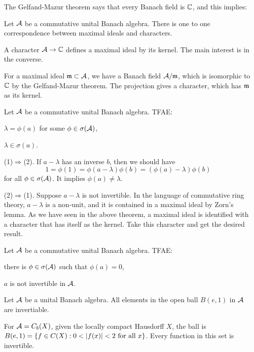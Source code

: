 \documentclass{../crs}
\begin{document}
The Gelfand-Mazur theorem says that every Banach field is $\mathbb{C}$, and this implies:
\begin{thm}
Let $\mathcal{A}$ be a commutative unital Banach algebra.
There is one to one correspondence between maximal ideals and characters.
\end{thm}
\begin{pf}
A character $\cA\to\C$ defines a maximal ideal by its kernel.
The main interest is in the converse.

For a maximal ideal $\mathfrak{m}\subset\mathcal{A}$, we have a Banach field $\mathcal{A}/\mathfrak{m}$, which is isomorphic to $\mathbb{C}$ by the Gelfand-Mazur theorem.
The projection gives a character, which has $\mathfrak{m}$ as its kernel.
\end{pf}

\begin{thm}
Let $\mathcal{A}$ be a commutative unital Banach algebra.
TFAE:
\begin{cond}
\item $\lambda=\phi(a)$ for some $\phi\in\sigma(\mathcal{A})$,
\item $\lambda\in\sigma(a)$.
\end{cond}
\end{thm}
\begin{pf}
(1)$\Rightarrow$(2).
If $a-\lambda$ has an inverse $b$, then we should have
\[1=\phi(1)=\phi(a-\lambda)\phi(b)=(\phi(a)-\lambda)\phi(b)\]
for all $\phi\in\sigma(\mathcal{A})$.
It implies $\phi(a)\ne\lambda$.

(2)$\Rightarrow$(1).
Suppose $a-\lambda$ is not invertible.
In the language of commutative ring theory, $a-\lambda$ is a non-unit, and it is contained in a maximal ideal by Zorn's lemma.
As we have seen in the above theorem, a maximal ideal is identified with a character that has itself as the kernel.
Take this character and get the desired result.
\end{pf}

\begin{cor}
Let $\mathcal{A}$ be a commutative unital Banach algebra.
TFAE:
\begin{cond}
\item there is $\phi\in\sigma(\mathcal{A})$ such that $\phi(a)=0$,
\item $a$ is not invertible in $\mathcal{A}$.
\end{cond}
\end{cor}
\begin{cor}
Let $\mathcal{A}$ be a unital Banach algebra.
All elements in the open ball $B(e,1)$ in $\mathcal{A}$ are invertiable.
\end{cor}
\begin{ex}
For $\mathcal{A}=C_b(X)$, given the locally compact Hausdorff $X$, the ball is $B(e,1)=\{f\in C(X):0<|f(x)|<2\p{for all}x\}$.
Every function in this set is invertible.
\end{ex}
\end{document}

